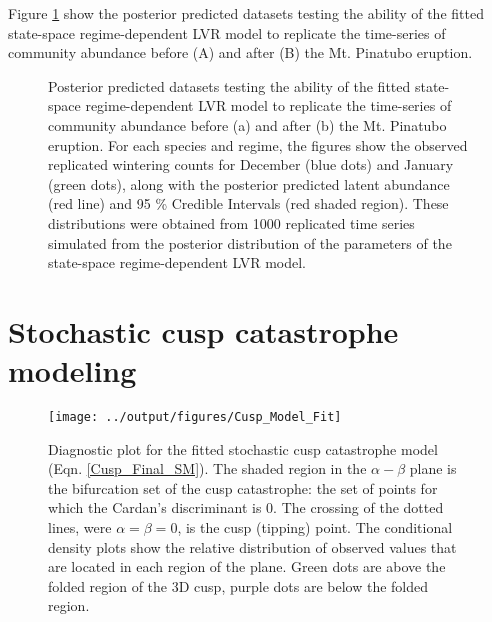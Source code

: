 \documentclass[11pt]{article}
\begin{document}
{Figure \ref{fig:PPC} show the posterior predicted datasets testing the ability of the fitted state-space regime-dependent LVR model to replicate the time-series of community abundance before (A) and after (B) the Mt. Pinatubo eruption.

\renewcommand{\thefigure}{S3}
\begin{figure}[htbp]
	\centering
	\qquad
	\caption{Posterior predicted datasets testing the ability of the fitted state-space regime-dependent LVR model to replicate the time-series of community abundance before (a) and after (b) the Mt. Pinatubo eruption. For each species and regime, the figures show the observed replicated wintering counts for December (blue dots) and January (green dots), along with the posterior predicted latent abundance (red line) and 95 \% Credible Intervals (red shaded region). These distributions were obtained from 1000 replicated time series simulated from the posterior distribution of the parameters of the state-space regime-dependent LVR model.}%
	\label{fig:PPC}%
\end{figure}

\section{Stochastic cusp catastrophe modeling}

\renewcommand{\thefigure}{S4}
\begin{figure}[h!]
	\centering
	\texttt{[image: ../output/figures/Cusp\_Model\_Fit]}
	\caption[Diagnostic plot for the fitted stochastic cusp catastrophe model]{Diagnostic plot for the fitted stochastic cusp catastrophe model (Eqn. \ref{Cusp_Final_SM}). The shaded region in the  $ \alpha-\beta $ plane is the bifurcation set of the cusp catastrophe: the set of points for which the Cardan's discriminant is 0. The crossing of the dotted lines, were $ \alpha = \beta = 0 $, is the cusp (tipping) point. The conditional density plots show the relative distribution of observed values that are located in each region of the plane. Green dots are above the folded region of the 3D cusp, purple dots are below the folded region.}
	\label{fig:Cusp_Model_Fit}
\end{figure}

}
\end{document}
